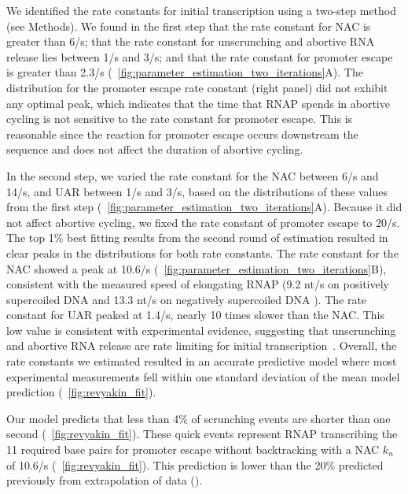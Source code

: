 %

We identified the rate constants for initial transcription using a two-step
method (see Methods). We found in the first step that the rate constant for
NAC is greater than 6/s; that the rate constant for unscrunching and abortive
RNA release lies between 1/s and 3/s; and that the rate constant for promoter
escape is greater than 2.3/s
(\FIG~\ref{fig:parameter_estimation_two_iterations}A). The distribution for the
promoter escape rate constant (right panel) did not exhibit any optimal peak,
which indicates that the time that RNAP spends in abortive cycling is not
sensitive to the rate constant for promoter escape. This is reasonable since
the reaction for promoter escape occurs downstream the sequence and does not
affect the duration of abortive cycling.   

In the second step, we varied the rate constant for the NAC between 6/s and
14/s, and UAR between 1/s and 3/s, based on the distributions of these values
from the first step (\FIG~\ref{fig:parameter_estimation_two_iterations}A). Because it
did not affect abortive cycling, we fixed the rate constant of promoter escape
to 20/s. The top 1\% best fitting results from the second round of estimation
resulted in clear peaks in the distributions for both rate constants. The rate
constant for the NAC showed a peak at 10.6/s
(\FIG~\ref{fig:parameter_estimation_two_iterations}B), consistent with the measured
speed of elongating RNAP (9.2 nt/s on positively supercoiled DNA and 13.3 nt/s
on negatively supercoiled DNA \cite{revyakin_abortive_2006}). The rate constant
for UAR peaked at 1.4/s, nearly 10 times slower than the NAC. This low value is
consistent with experimental evidence, suggesting that unscrunching and
abortive RNA release are rate limiting for initial
transcription~\cite{revyakin_abortive_2006, margeat_direct_2006}. Overall, the
rate constants we estimated resulted in an accurate predictive model where most
experimental measurements fell within one standard deviation of the mean model
prediction (\FIG~\ref{fig:revyakin_fit}). 

  
Our model predicts that less than 4\% of scrunching events are shorter than
one second (\FIG~\ref{fig:revyakin_fit}). These quick events represent RNAP
transcribing the 11 required base pairs for promoter escape without
backtracking with a NAC $k_n$ of 10.6/s
(\FIG~\ref{fig:revyakin_fit}). This prediction is lower than the 20\%
predicted previously from extrapolation of data
(\cite{revyakin_abortive_2006}).  

